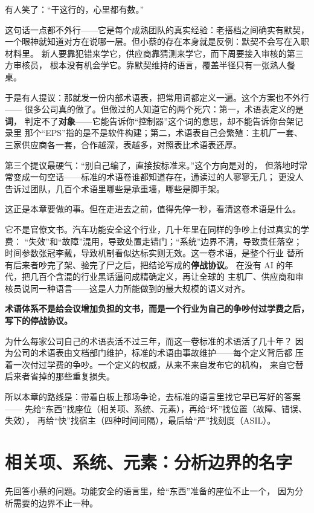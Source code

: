 有人笑了：“干这行的，心里都有数。”

这句话一点都不外行——它是每个成熟团队的真实经验：老搭档之间确实有默契，
一个眼神就知道对方在说哪一层。但小蔡的存在本身就是反例：默契不会写在入职材料里。
新人要靠犯错来学它，供应商靠猜测来学它，而下周要接入审核的第三方审核员，
根本没有机会学它。靠默契维持的语言，覆盖半径只有一张熟人餐桌。

于是有人提议：那就发一份内部术语表，把常用词都定义一遍。这个方案也不外行——
很多公司真的做了。但做过的人知道它的两个死穴：第一，术语表定义的是\textbf{词}，
判定不了\textbf{对象}——它能告诉你“控制器”这个词的意思，却不能告诉你台架记录里
那个“EPS”指的是不是软件构建；第二，术语表自己会繁殖：主机厂一套、
三家供应商各一套，合作越深，表越多，对照表比术语表还厚。

第三个提议最硬气：“别自己编了，直接按标准来。”这个方向是对的，
但落地时常常变成一句空话——标准的术语卷谁都知道存在，通读过的人寥寥无几；
更没人告诉过团队，几百个术语里哪些是承重墙，哪些是脚手架。

这正是本章要做的事。但在走进去之前，值得先停一秒，看清这卷术语是什么。

它不是官僚文书。汽车功能安全这个行业，几十年里在同样的争吵上付过真实的学费：
“失效”和“故障”混用，导致处置走错门；“系统”边界不清，导致责任落空；
时间参数张冠李戴，导致机制看似达标实则无效。这一卷术语，是整个行业
替所有后来者吵完了架、验完了尸之后，把结论写成的\textbf{停战协议}。
在没有 AI 的年代，把几百个含混的行业黑话逼问成精确定义，再让全球的
主机厂、供应商和审核员说同一种语言——这是人力所能做到的最大规模的语义对齐。

\textbf{术语体系不是给会议增加负担的文书，而是一个行业为自己的争吵付过学费之后，写下的停战协议。}

为什么每家公司自己的术语表活不过三年，而这一卷标准的术语活了几十年？
因为公司的术语表由文档部门维护，标准的术语由事故维护——每个定义背后都
压着一次付过学费的争吵。一个定义的权威，从来不来自发布它的机构，
来自它替后来者省掉的那些重复损失。

所以本章的路线是：带着白板上那场争论，去标准的语言里找它早已写好的答案——
先给“东西”找座位（相关项、系统、元素），再给“坏”找位置（故障、错误、失效），
再给“快”找宿主（四种时间间隔），最后给“严”找刻度（ASIL）。

\section{相关项、系统、元素：分析边界的名字}

先回答小蔡的问题。功能安全的语言里，给“东西”准备的座位不止一个，
因为分析需要的边界不止一种。

